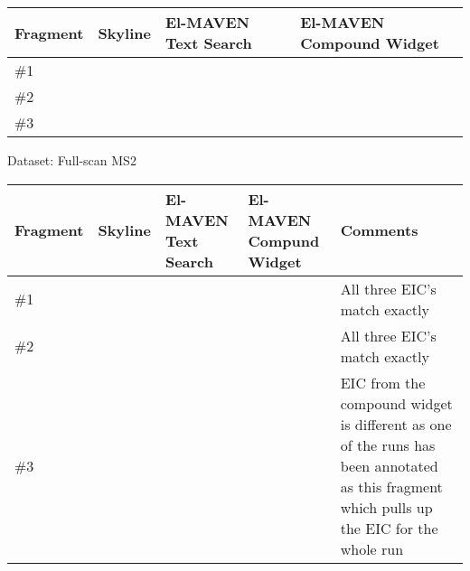 \documentclass[letterpaper,10pt,english,openany,oneside]{sphinxmanual}
\begin{document}
\begin{savenotes}\sphinxattablestart
\centering
\begin{tabulary}{\linewidth}[t]{|T|T|T|T|}
\hline
\sphinxstyletheadfamily 
Fragment
&\sphinxstyletheadfamily 
Skyline
&\sphinxstyletheadfamily 
El-MAVEN Text
Search
&\sphinxstyletheadfamily 
El-MAVEN Compound
Widget
\\
\hline
\#1
&
&
&
\\
\hline
\#2
&
&
&
\\
\hline
\#3
&
&
&
\\
\hline
\end{tabulary}
\par
\sphinxattableend\end{savenotes}

Dataset: Full-scan MS2


\begin{savenotes}\sphinxattablestart
\centering
\begin{tabulary}{\linewidth}[t]{|T|T|T|T|T|}
\hline
\sphinxstyletheadfamily 
Fragment
&\sphinxstyletheadfamily 
Skyline
&\sphinxstyletheadfamily 
El-MAVEN Text
Search
&\sphinxstyletheadfamily 
El-MAVEN Compund
Widget
&\sphinxstyletheadfamily 
Comments
\\
\hline
\#1
&
&
&
&
All three EIC’s
match exactly
\\
\hline
\#2
&
&
&
&
All three EIC’s
match exactly
\\
\hline
\#3
&
&
&
&
EIC from the
compound widget is
different as one of
the runs has been
annotated as this
fragment which
pulls up the EIC
for the whole run
\\
\hline
\end{tabulary}
\par
\sphinxattableend\end{savenotes}
\end{document}
